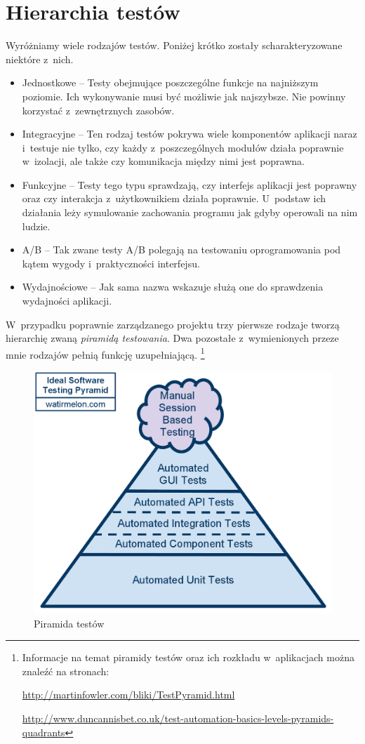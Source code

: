 \documentclass[brudnopis]{xmgr}
\begin{document}
\section{Hierarchia testów}

Wyróżniamy wiele rodzajów testów. Poniżej krótko zostały scharakteryzowane niektóre z~nich.
\begin{itemize}
  \item Jednostkowe -- Testy obejmujące poszczególne funkcje na najniższym poziomie. Ich wykonywanie musi być możliwie jak najszybsze. Nie powinny korzystać z~zewnętrznych zasobów.
  \item Integracyjne -- Ten rodzaj testów pokrywa wiele komponentów aplikacji naraz i~testuje nie tylko, czy każdy z~poszczególnych modułów działa poprawnie w~izolacji, ale także czy komunikacja między nimi jest poprawna.
  \item Funkcyjne -- Testy tego typu sprawdzają, czy interfejs aplikacji jest poprawny oraz czy interakcja z~użytkownikiem działa poprawnie. U~podstaw ich działania leży symulowanie zachowania programu jak gdyby operowali na nim ludzie. 
  \item A/B -- Tak zwane testy A/B polegają na testowaniu oprogramowania pod kątem wygody i~praktyczności interfejsu.
  \item Wydajnościowe -- Jak sama nazwa wskazuje służą one do sprawdzenia wydajności aplikacji.
\end{itemize}

W~przypadku poprawnie zarządzanego projektu trzy pierwsze rodzaje tworzą hierarchię zwaną \textit{piramidą testowania}. Dwa pozostałe z~wymienionych przeze mnie rodzajów pełnią funkcję uzupełniającą. 
\footnote{
Informacje na temat piramidy testów oraz ich rozkładu w~aplikacjach można znaleźć na stronach:

\url{http://martinfowler.com/bliki/TestPyramid.html}

\url{http://www.duncannisbet.co.uk/test-automation-basics-levels-pyramids-quadrants}
}

\begin{figure}[h]
    \centering
    \includegraphics[scale=0.25]{idealautomatedtestingpyramid.png}
    \caption{Piramida testów}
    \label{fig:pyramis}
\end{figure}
\end{document}
